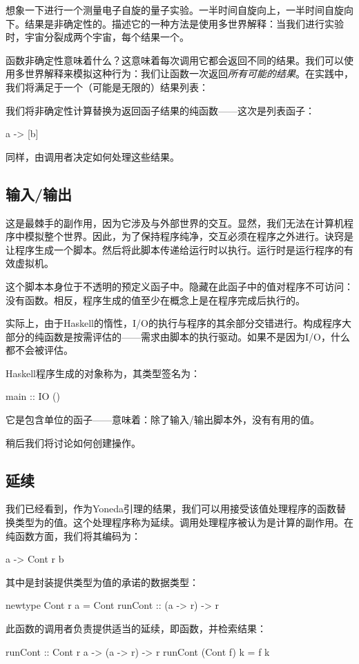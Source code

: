 \documentclass[DaoFP]{subfiles}
\begin{document}
想象一下进行一个测量电子自旋的量子实验。一半时间自旋向上，一半时间自旋向下。结果是非确定性的。描述它的一种方法是使用多世界解释：当我们进行实验时，宇宙分裂成两个宇宙，每个结果一个。

函数非确定性意味着什么？这意味着每次调用它都会返回不同的结果。我们可以使用多世界解释来模拟这种行为：我们让函数一次返回\emph{所有可能的结果}。在实践中，我们将满足于一个（可能是无限的）结果列表：

我们将非确定性计算替换为返回函子结果的纯函数——这次是列表函子：
\begin{haskell}
a -> [b]
\end{haskell}
同样，由调用者决定如何处理这些结果。

\subsection{输入/输出}

这是最棘手的副作用，因为它涉及与外部世界的交互。显然，我们无法在计算机程序中模拟整个世界。因此，为了保持程序纯净，交互必须在程序之外进行。诀窍是让程序生成一个脚本。然后将此脚本传递给运行时以执行。运行时是运行程序的有效虚拟机。

这个脚本本身位于不透明的预定义函子中。隐藏在此函子中的值对程序不可访问：没有函数。相反，程序生成的值至少在概念上是在程序完成后执行的。

实际上，由于Haskell的惰性，I/O的执行与程序的其余部分交错进行。构成程序大部分的纯函数是按需评估的——需求由脚本的执行驱动。如果不是因为I/O，什么都不会被评估。

Haskell程序生成的对象称为，其类型签名为：
\begin{haskell}
main :: IO ()
\end{haskell}
它是包含单位的函子——意味着：除了输入/输出脚本外，没有有用的值。

稍后我们将讨论如何创建操作。

\subsection{延续}

我们已经看到，作为Yoneda引理的结果，我们可以用接受该值处理程序的函数替换类型为的值。这个处理程序称为延续。调用处理程序被认为是计算的副作用。在纯函数方面，我们将其编码为：
\begin{haskell}
a -> Cont r b
\end{haskell}
其中是封装提供类型为值的承诺的数据类型：
\begin{haskell}
newtype Cont r a = Cont { runCont :: (a -> r) -> r }
\end{haskell}
此函数的调用者负责提供适当的延续，即函数，并检索结果：
\begin{haskell}
runCont :: Cont r a -> (a -> r) -> r
runCont (Cont f) k = f k
\end{haskell}
\end{document}
